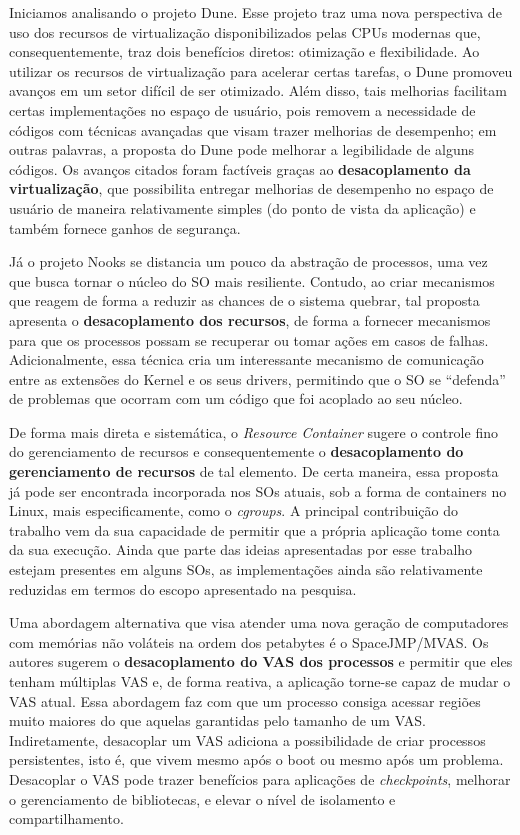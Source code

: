 Iniciamos analisando o projeto Dune. Esse projeto traz uma nova perspectiva de uso dos recursos de virtualização
disponibilizados pelas CPUs modernas que, consequentemente, traz dois
benefícios diretos: otimização e flexibilidade. Ao utilizar os recursos de
virtualização para acelerar certas tarefas, o Dune promoveu avanços em um setor
difícil de ser otimizado. Além disso, tais melhorias facilitam certas
implementações no espaço de usuário, pois removem a necessidade de códigos com
técnicas avançadas que visam trazer melhorias de desempenho; em outras
palavras, a proposta do Dune pode melhorar a legibilidade de alguns códigos.
Os avanços citados foram factíveis graças ao \textbf{desacoplamento da
virtualização}, que possibilita entregar melhorias de desempenho no
espaço de usuário de maneira relativamente simples (do ponto de vista da
aplicação) e também fornece ganhos de segurança.

Já o projeto Nooks se distancia um pouco da abstração de processos, uma vez que
busca tornar o núcleo do SO mais resiliente. Contudo, ao criar mecanismos
que reagem de forma a reduzir as chances de o sistema quebrar, tal proposta
apresenta o \textbf{desacoplamento dos recursos}, de forma a fornecer mecanismos
para que os processos possam se recuperar ou tomar ações em casos de falhas.
Adicionalmente, essa técnica cria um interessante mecanismo de
comunicação entre as extensões do Kernel e os seus drivers, permitindo que o SO
se ``defenda'' de problemas que ocorram com um código que foi acoplado ao seu
núcleo.

De forma mais direta e sistemática, o \textit{Resource Container} sugere o
controle fino do gerenciamento de recursos e consequentemente o
\textbf{desacoplamento do gerenciamento de recursos} de tal elemento. De certa
maneira, essa proposta já pode ser encontrada incorporada nos SOs atuais, sob a
forma de containers no Linux, mais especificamente, como o \textit{cgroups}. A
principal contribuição do trabalho vem da sua capacidade de permitir que a
própria aplicação tome conta da sua execução. Ainda que parte das ideias
apresentadas por esse trabalho estejam presentes em alguns SOs, as
implementações ainda são relativamente reduzidas em termos do escopo
apresentado na pesquisa.

Uma abordagem alternativa que visa atender uma nova geração de computadores com
memórias não voláteis na ordem dos petabytes é o SpaceJMP/MVAS.  Os autores
sugerem o \textbf{desacoplamento do VAS dos processos} e permitir que eles tenham
múltiplas VAS e, de forma reativa, a aplicação torne-se capaz de mudar o VAS
atual. Essa abordagem faz com que um processo consiga acessar regiões muito
maiores do que aquelas garantidas pelo tamanho de um VAS. Indiretamente,
desacoplar um VAS adiciona a possibilidade de criar processos persistentes,
isto é, que vivem mesmo após o boot ou mesmo após um problema. Desacoplar o VAS
pode trazer benefícios para aplicações de \textit{checkpoints}, melhorar o
gerenciamento de bibliotecas, e elevar o nível de isolamento e compartilhamento.

